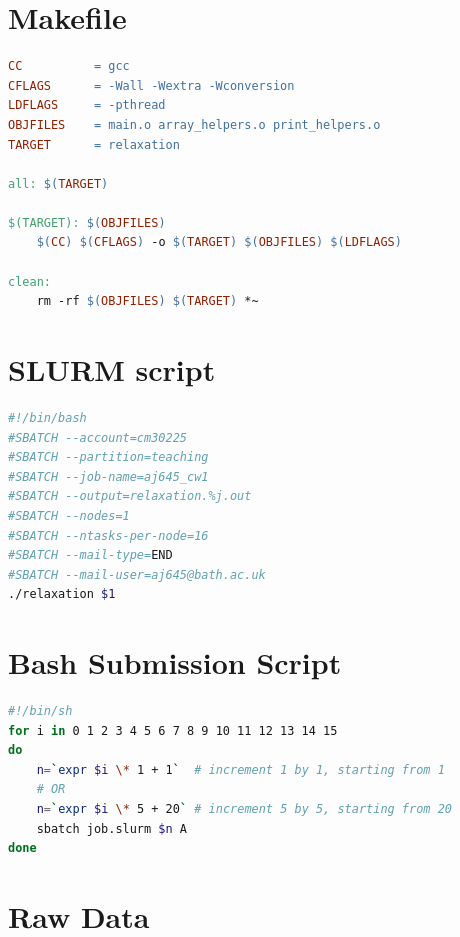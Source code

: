 \documentclass[letterpaper,12pt]{article}
\begin{document}
\newpage
\begin{appendices}

\section{Makefile}
\label{sec:makefile}
\begin{lstlisting}[language=make]
CC			= gcc
CFLAGS		= -Wall -Wextra -Wconversion
LDFLAGS		= -pthread
OBJFILES	= main.o array_helpers.o print_helpers.o
TARGET		= relaxation

all: $(TARGET)

$(TARGET): $(OBJFILES)
	$(CC) $(CFLAGS) -o $(TARGET) $(OBJFILES) $(LDFLAGS)
	
clean:
	rm -rf $(OBJFILES) $(TARGET) *~
\end{lstlisting}

\section{SLURM script}
\label{sec:slurm}

\begin{lstlisting}[language=bash]
#!/bin/bash
#SBATCH --account=cm30225
#SBATCH --partition=teaching
#SBATCH --job-name=aj645_cw1
#SBATCH --output=relaxation.%j.out
#SBATCH --nodes=1
#SBATCH --ntasks-per-node=16
#SBATCH --mail-type=END
#SBATCH --mail-user=aj645@bath.ac.uk
./relaxation $1
\end{lstlisting}

\section{Bash Submission Script}
\label{sec:bash}

\begin{lstlisting}[language=bash]
#!/bin/sh
for i in 0 1 2 3 4 5 6 7 8 9 10 11 12 13 14 15
do
    n=`expr $i \* 1 + 1`  # increment 1 by 1, starting from 1
    # OR
	n=`expr $i \* 5 + 20` # increment 5 by 5, starting from 20
    sbatch job.slurm $n A
done

\end{lstlisting}

\newpage
\section{Raw Data}
\label{sec:raw_data}



\begin{landscape}




\end{landscape}

\end{appendices}
\end{document}
